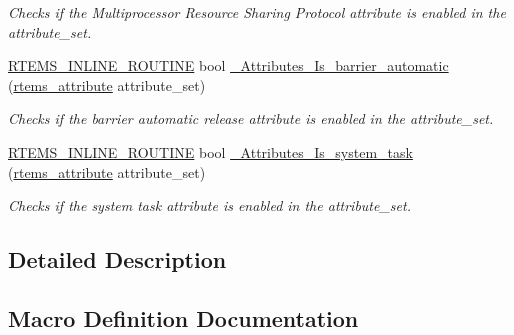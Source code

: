 \begin{DoxyCompactItemize}
\begin{DoxyCompactList}\small\item\em Checks if the Multiprocessor Resource Sharing Protocol attribute is enabled in the attribute\+\_\+set. \end{DoxyCompactList}\item 
\mbox{\hyperlink{group__RTEMSScoreBaseDefs_gac216239df231d5dbd15e3520b0b9313f}{R\+T\+E\+M\+S\+\_\+\+I\+N\+L\+I\+N\+E\+\_\+\+R\+O\+U\+T\+I\+NE}} bool \mbox{\hyperlink{group__ClassicAttributesImpl_ga40889ebe1ba24369464c3b8d01d8a0a5}{\+\_\+\+Attributes\+\_\+\+Is\+\_\+barrier\+\_\+automatic}} (\mbox{\hyperlink{group__ClassicAttributes_gaea40313cf78ed843e09c4315d0a10f79}{rtems\+\_\+attribute}} attribute\+\_\+set)
\begin{DoxyCompactList}\small\item\em Checks if the barrier automatic release attribute is enabled in the attribute\+\_\+set. \end{DoxyCompactList}\item 
\mbox{\hyperlink{group__RTEMSScoreBaseDefs_gac216239df231d5dbd15e3520b0b9313f}{R\+T\+E\+M\+S\+\_\+\+I\+N\+L\+I\+N\+E\+\_\+\+R\+O\+U\+T\+I\+NE}} bool \mbox{\hyperlink{group__ClassicAttributesImpl_ga374b35faccb78aae71b9bf8b72ae0955}{\+\_\+\+Attributes\+\_\+\+Is\+\_\+system\+\_\+task}} (\mbox{\hyperlink{group__ClassicAttributes_gaea40313cf78ed843e09c4315d0a10f79}{rtems\+\_\+attribute}} attribute\+\_\+set)
\begin{DoxyCompactList}\small\item\em Checks if the system task attribute is enabled in the attribute\+\_\+set. \end{DoxyCompactList}\end{DoxyCompactItemize}


\subsection{Detailed Description}


\subsection{Macro Definition Documentation}
\mbox{\label{group__ClassicAttributesImpl_gabba89e291c7bdd32056f09e569067518}} 
